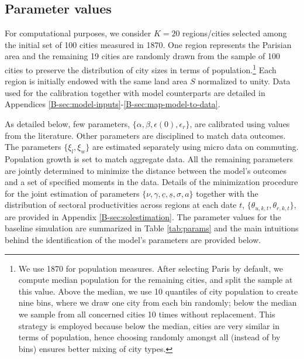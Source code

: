 \documentclass[./20250130-paper.tex]{subfiles}
\begin{document}
\subsection{Parameter values}\label{sec:calibration}

For computational purposes, we consider $K=20$ regions/cities selected among the initial set of 100 cities measured in 1870. One region represents the Parisian area and the remaining 19 cities are randomly drawn from the sample of 100 cities to preserve the distribution of city sizes in terms of population.\footnote{We use 1870 for population measures. After selecting Paris by default, we compute median population for the remaining cities, and split the sample at this value. Above the median, we use 10 quantiles of city population to create nine bins, where we draw one city from each bin randomly; below the median we sample from all concerned cities 10 times without replacement. This strategy is employed because below the median, cities are very similar in terms of population, hence choosing randomly amongst all (instead of by bins) ensures better mixing of city types.} Each region is initially endowed with the same land area $S$ normalized to unity. Data used for the calibration together with model counterparts are detailed in Appendices \ref{B-sec:model-inputs}-\ref{B-sec:map-model-to-data}.

As detailed below, few parameters, $\{\alpha,\beta,\epsilon(0),\epsilon_r\}$, are calibrated using values from the literature. Other parameters are disciplined to match data outcomes. The parameters $\{\xi_l,\xi_w\}$ are estimated separately using micro data on commuting. Population growth is set to match aggregate data. All the remaining parameters are jointly determined to minimize the distance between the model's outcomes and a set of specified moments in the data. Details of the minimization procedure for the joint estimation of parameters $\{\nu, \gamma, \underline{c}, \underline{s}, \sigma, a\}$ together with the distribution of sectoral productivities across regions at each date $t$, $\{\theta_{u,k,t}, \theta_{r,k,t}\}$, are provided in Appendix \ref{B-sec:solestimation}. The parameter values for the baseline simulation are summarized in Table \ref{tab:params} and the main intuitions behind the identification of the model's parameters are provided below. 
\end{document}
